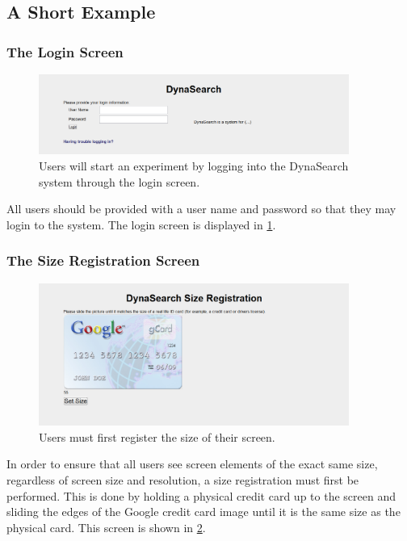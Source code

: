 \documentclass[article]{ij4uq}              %
\begin{document}
\subsection{A Short Example}

\subsubsection{The Login Screen}

\begin{figure}[h!]
 \centering
 \includegraphics[width=4.0in]{figures/login.png}
 \caption{Users will start an experiment by logging into the DynaSearch system through the login screen.}
 \label{fig:login}
\end{figure}
\FloatBarrier

All users should be provided with a user name and password so that they may login to the system. The login screen is displayed in \ref{fig:login}.

\subsubsection{The Size Registration Screen}

\begin{figure}[h!]
 \centering
 \includegraphics[width=4.0in]{figures/size_reg.png}
 \caption{Users must first register the size of their screen.}
 \label{fig:sizereg}
\end{figure}
\FloatBarrier


In order to ensure that all users see screen elements of the exact same size, regardless of screen size and resolution, a size registration must first be performed. This is done by holding a physical credit card up to the screen and sliding the edges of the Google credit card image until it is the same size as the physical card. This screen is shown in \ref{fig:sizereg}.
\end{document}
